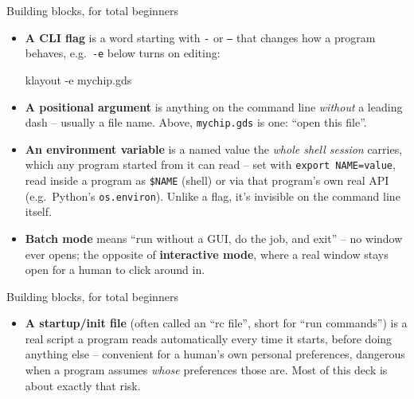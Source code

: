 \documentclass[aspectratio=169]{beamer}
\begin{document}
\begin{frame}[fragile]{Building blocks, for total beginners}
\begin{itemize}
  \item \textbf{A CLI flag} is a word starting with \texttt{-} or
        \texttt{--} that changes how a program behaves, e.g.\
        \texttt{-e} below turns on editing:
\begin{cli}
klayout -e mychip.gds
\end{cli}
  \item \textbf{A positional argument} is anything on the command
        line \emph{without} a leading dash -- usually a file name.
        Above, \texttt{mychip.gds} is one: ``open this file''.
  \item \textbf{An environment variable} is a named value the
        \emph{whole shell session} carries, which any program started
        from it can read -- set with \texttt{export NAME=value}, read
        inside a program as \texttt{\$NAME} (shell) or via that
        program's own real API (e.g.\ Python's \texttt{os.environ}).
        Unlike a flag, it's invisible on the command line itself.
  \item \textbf{Batch mode} means ``run without a GUI, do the job, and
        exit'' -- no window ever opens; the opposite of
        \textbf{interactive mode}, where a real window stays open for
        a human to click around in.
\end{itemize}
\end{frame}
\begin{frame}[fragile]{Building blocks, for total beginners}
\begin{itemize}
  \item \textbf{A startup/init file} (often called an ``rc file'',
        short for ``run commands'') is a real script a program reads
        automatically every time it starts, before doing anything
        else -- convenient for a human's own personal preferences,
        dangerous when a program assumes \emph{whose} preferences
        those are. Most of this deck is about exactly that risk.
\end{itemize}
\end{frame}

\end{document}
